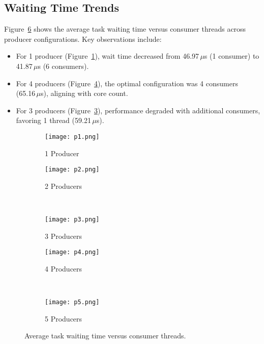 \documentclass{article}
\begin{document}
\subsection{Waiting Time Trends}
Figure~\ref{fig:results} shows the average task waiting time versus consumer threads across producer configurations. Key observations include:
\begin{itemize}
    \item For 1 producer (Figure~\ref{fig:prod1}), wait time decreased from 46.97\,$\mu$s (1 consumer) to 41.87\,$\mu$s (6 consumers).
    \item For 4 producers (Figure~\ref{fig:prod4}), the optimal configuration was 4 consumers (65.16\,$\mu$s), aligning with core count.
    \item For 3 producers (Figure~\ref{fig:prod3}), performance degraded with additional consumers, favoring 1 thread (59.21\,$\mu$s).
\end{itemize}

\begin{figure}[ht]
    \centering
    \begin{subfigure}[b]{0.45\textwidth}
        \texttt{[image: p1.png]}
        \caption{1 Producer}
        \label{fig:prod1}
    \end{subfigure}
    \begin{subfigure}[b]{0.45\textwidth}
        \texttt{[image: p2.png]}
        \caption{2 Producers}
        \label{fig:prod2}
    \end{subfigure}
    \\
    \begin{subfigure}[b]{0.45\textwidth}
        \texttt{[image: p3.png]}
        \caption{3 Producers}
        \label{fig:prod3}
    \end{subfigure}
    \begin{subfigure}[b]{0.45\textwidth}
        \texttt{[image: p4.png]}
        \caption{4 Producers}
        \label{fig:prod4}
    \end{subfigure}
    \\
    \begin{subfigure}[b]{0.45\textwidth}
        \texttt{[image: p5.png]}
        \caption{5 Producers}
        \label{fig:prod5}
    \end{subfigure}
    \caption{Average task waiting time versus consumer threads.}
    \label{fig:results}
\end{figure}
\end{document}
